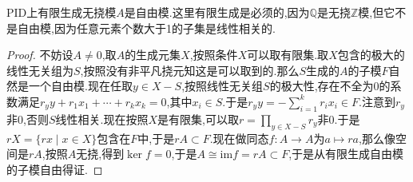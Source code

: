 PID上有限生成无挠模$A$是自由模.这里有限生成是必须的,因为$\mathbb{Q}$是无挠$\mathbb{Z}$模,但它不是自由模,因为任意元素个数大于1的子集是线性相关的.
\begin{proof}
	
	不妨设$A\not=0$,取$A$的生成元集$X$,按照条件$X$可以取有限集.取$X$包含的极大的线性无关组为$S$,按照没有非平凡挠元知这是可以取到的.那么$S$生成的$A$的子模$F$自然是一个自由模.现在任取$y\in X-S$,按照线性无关组$S$的极大性,存在不全为0的系数满足$r_yy+r_1x_1+\cdots+r_kx_k=0$,其中$x_i\in S$.于是$r_yy=-\sum_{i=1}^{k}r_ix_i\in F$.注意到$r_y$非0,否则$S$线性相关.现在按照$X$是有限集,可以取$r=\prod_{y\in X-S}r_y$非0.于是$rX=\{rx\mid x\in X\}$包含在$F$中,于是$rA\subset F$.现在做同态$f:A\to A$为$a\mapsto ra$,那么像空间是$rA$,按照$A$无挠,得到$\ker f=0$,于是$A\cong\mathrm{im}f=rA\subset F$,于是从有限生成自由模的子模自由得证.
\end{proof}

